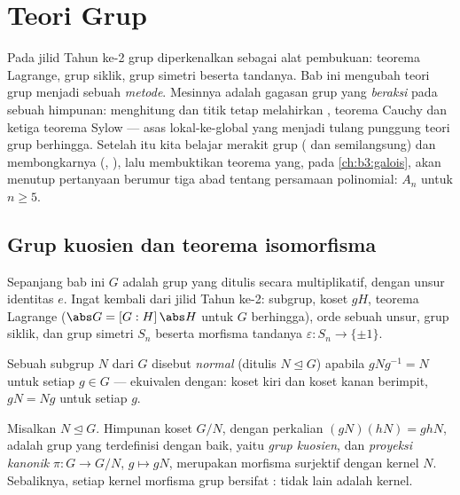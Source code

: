 \chapter{Teori Grup}\label{ch:b3:groups}

Pada jilid Tahun ke-2 grup diperkenalkan sebagai alat pembukuan: teorema
Lagrange, grup siklik, grup simetri beserta tandanya. Bab ini
mengubah teori grup menjadi sebuah \emph{metode}. Mesinnya adalah
gagasan grup yang \emph{beraksi} pada sebuah himpunan: menghitung
 dan titik tetap melahirkan , teorema Cauchy dan
ketiga teorema Sylow --- asas lokal-ke-global yang menjadi tulang
punggung teori grup berhingga. Setelah itu kita belajar merakit grup
( dan semilangsung) dan membongkarnya (, ), lalu membuktikan teorema yang, pada
\cref{ch:b3:galois}, akan menutup pertanyaan berumur tiga abad
tentang persamaan polinomial:  $A_n$  untuk $n
\geq 5$.

\section{Grup kuosien dan teorema isomorfisma}

Sepanjang bab ini $G$ adalah grup yang ditulis secara multiplikatif,
dengan unsur identitas $e$. Ingat kembali dari jilid Tahun ke-2:
subgrup, koset $gH$, teorema Lagrange ($\abs G = [G:H]\,\abs H$ untuk
$G$ berhingga), orde sebuah unsur, grup siklik, dan grup simetri $S_n$
beserta morfisma tandanya $\varepsilon \colon S_n \to \{\pm1\}$.

\begin{definition}\label{def:b3:groups:normal}
Sebuah subgrup $N$ dari $G$ disebut \emph{normal}
(ditulis $N \trianglelefteq G$) apabila $gNg^{-1} = N$ untuk setiap $g
\in G$ --- ekuivalen dengan: koset kiri dan koset kanan berimpit, $gN =
Ng$ untuk setiap $g$.
\end{definition}

\begin{theorem}\label{thm:b3:groups:quotient}
Misalkan $N \trianglelefteq G$. Himpunan koset $G/N$, dengan
perkalian $(gN)(hN) = ghN$, adalah grup yang terdefinisi dengan baik,
yaitu \emph{grup kuosien}, dan
\emph{proyeksi kanonik} $\pi \colon G \to G/N$, $g \mapsto gN$,
merupakan morfisma surjektif dengan kernel $N$. Sebaliknya, setiap
kernel morfisma grup bersifat :  tidak lain
adalah kernel.
\end{theorem}

